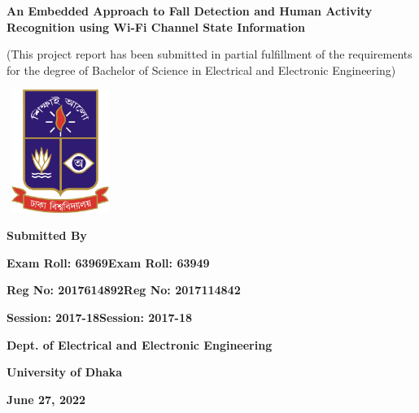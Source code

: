 \documentclass[a4paper, 12pt, oneside]{Thesis}  %
\begin{document}
\frontmatter	  %
\begin{titlepage}
   \begin{center}
       \vspace{1cm}
       \Huge
       \textbf{An Embedded Approach to Fall Detection and Human Activity Recognition using Wi-Fi Channel State Information}
        
      \normalsize    
       \vspace{0.5cm}
        (This project report has been submitted in partial fulfillment of the requirements for the degree of Bachelor of Science in Electrical and Electronic Engineering)
            
       \vspace{1.5cm}
       \includegraphics[width=3.5cm, height=4cm]{university.png}
       
       \Large
       \vspace{1cm}
       \textbf{Submitted By}    
       
       
       \large
       \textbf{Exam Roll: 63969}\hfill \textbf{Exam Roll: 63949} 
       
       \textbf{Reg No: 2017614892}\hfill \textbf{Reg No: 2017114842}
       
       \textbf{Session: 2017-18}\hfill \textbf{Session: 2017-18}
       
       \vspace{1cm}
       
       \textbf{Dept. of Electrical and Electronic Engineering}
       
       \textbf{University of Dhaka}

        \textbf{June 27, 2022}
       
       
   \end{center}
\end{titlepage}


\end{document}
